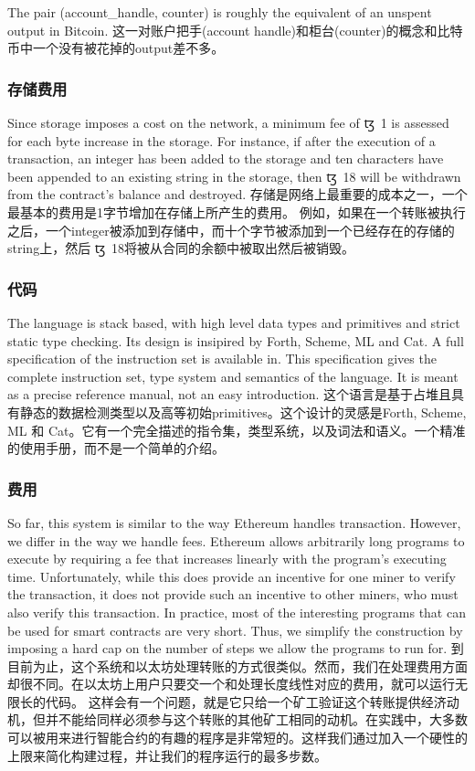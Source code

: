 \documentclass[letterpaper]{article}
\newcommand{\tz}{{\fontspec{DejaVu Sans} \small{ꜩ}}}
\begin{document}
The pair (account\_handle, counter) is roughly the equivalent of an unspent
output in Bitcoin.
这一对账户把手(account handle)和柜台(counter)的概念和比特币中一个没有被花掉的output差不多。

\subsubsection{存储费用}

Since storage imposes a cost on the network, a minimum fee of \tz~1 is assessed
for each byte increase in the storage. For instance, if after the execution of
a transaction, an integer has been added to the storage and ten characters have
been appended to an existing string in the storage, then \tz~18 will be withdrawn
from the contract's balance and destroyed. 
存储是网络上最重要的成本之一，一个最基本的费用是1字节增加在存储上所产生的费用。
例如，如果在一个转账被执行之后，一个integer被添加到存储中，而十个字节被添加到一个已经存在的存储的string上，然后\tz~18将被从合同的余额中被取出然后被销毁。


\subsubsection{代码}


The language is stack based, with high level data types and primitives and strict
static type checking. Its design is insipired by Forth, Scheme, ML and Cat.
A full specification of the instruction set is available in\cite{language}.
This specification gives the complete instruction set, type system and semantics
of the language. It is meant as a precise reference manual, not an easy introduction.
这个语言是基于占堆且具有静态的数据检测类型以及高等初始primitives。这个设计的灵感是Forth, Scheme, ML 和 Cat。它有一个完全描述的指令集，类型系统，以及词法和语义。一个精准的使用手册，而不是一个简单的介绍。

\subsubsection{费用}

So far, this system is similar to the way Ethereum handles transaction. However,
 we differ in the way we handle fees. Ethereum allows arbitrarily long programs
to execute by requiring a fee that increases linearly with the program's
executing time. Unfortunately, while this does provide an incentive for one
miner to verify the transaction, it does not provide such an incentive to other
miners, who must also verify this transaction. In practice, most of the
interesting programs that can be used for smart contracts are very short.
Thus, we simplify the construction by imposing a hard cap on the number of steps
we allow the programs to run for.
到目前为止，这个系统和以太坊处理转账的方式很类似。然而，我们在处理费用方面却很不同。在以太坊上用户只要交一个和处理长度线性对应的费用，就可以运行无限长的代码。
这样会有一个问题，就是它只给一个矿工验证这个转账提供经济动机，但并不能给同样必须参与这个转账的其他矿工相同的动机。在实践中，大多数可以被用来进行智能合约的有趣的程序是非常短的。这样我们通过加入一个硬性的上限来简化构建过程，并让我们的程序运行的最多步数。
\end{document}
